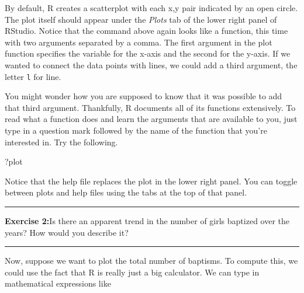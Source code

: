 \documentclass[]{book}
\newenvironment{Shaded}{\begin{snugshade}}{\end{snugshade}}
\newcommand{\DataTypeTok}[1]{\textcolor[rgb]{0.13,0.29,0.53}{#1}}
\newcommand{\KeywordTok}[1]{\textcolor[rgb]{0.13,0.29,0.53}{\textbf{#1}}}
\newcommand{\NormalTok}[1]{#1}
\newcommand{\OperatorTok}[1]{\textcolor[rgb]{0.81,0.36,0.00}{\textbf{#1}}}
\newcommand{\StringTok}[1]{\textcolor[rgb]{0.31,0.60,0.02}{#1}}
\theoremstyle{definition}
\theoremstyle{definition}
\theoremstyle{definition}
\theoremstyle{remark}
\begin{document}
By default, R creates a scatterplot with each x,y pair indicated by an
open circle. The plot itself should appear under the \emph{Plots} tab of
the lower right panel of RStudio. Notice that the command above again
looks like a function, this time with two arguments separated by a
comma. The first argument in the plot function specifies the variable
for the x-axis and the second for the y-axis. If we wanted to connect
the data points with lines, we could add a third argument, the letter
\texttt{l} for line.

\begin{Shaded}
\end{Shaded}

You might wonder how you are supposed to know that it was possible to
add that third argument. Thankfully, R documents all of its functions
extensively. To read what a function does and learn the arguments that
are available to you, just type in a question mark followed by the name
of the function that you're interested in. Try the following.

\begin{Shaded}
\begin{Highlighting}[]
\NormalTok{?plot}
\end{Highlighting}
\end{Shaded}

Notice that the help file replaces the plot in the lower right panel.
You can toggle between plots and help files using the tabs at the top of
that panel.

\begin{center}\rule{0.5\linewidth}{\linethickness}\end{center}

\textbf{Exercise 2:}Is there an apparent trend in the number of girls
baptized over the years? How would you describe it?

\begin{center}\rule{0.5\linewidth}{\linethickness}\end{center}

Now, suppose we want to plot the total number of baptisms. To compute
this, we could use the fact that R is really just a big calculator. We
can type in mathematical expressions like
\end{document}
